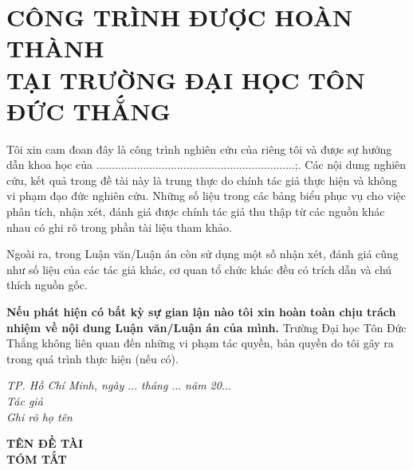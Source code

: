 \documentclass[12pt,a4paper]{report}
\numberwithin{figure}{chapter}
\numberwithin{table}{chapter}
\begin{document}
	\newpage
	\chapter*{CÔNG TRÌNH ĐƯỢC HOÀN THÀNH\\TẠI TRƯỜNG ĐẠI HỌC TÔN ĐỨC THẮNG}
	\qquad Tôi xin cam đoan đây là công trình nghiên cứu của riêng tôi và được sự hướng dẫn khoa học của ................................................................;. Các nội dung nghiên cứu, kết quả trong đề tài này là trung thực do chính tác giả thực hiện và không vi phạm đạo đức nghiên cứu. Những số liệu trong các bảng biểu phục vụ cho việc phân tích, nhận xét, đánh giá được chính tác giả thu thập từ các nguồn khác nhau có ghi rõ trong phần tài
	liệu tham khảo.
	
	\qquad Ngoài ra, trong Luận văn/Luận án còn sử dụng một số nhận xét, đánh giá cũng như số liệu của các tác giả khác, cơ quan tổ chức khác đều có trích dẫn và chú thích
	nguồn gốc.
	
	\qquad \textbf{Nếu phát hiện có bất kỳ sự gian lận nào tôi xin hoàn toàn chịu trách nhiệm về nội dung Luận văn/Luận án của mình.} Trường Đại học Tôn Đức Thắng không liên quan đến những vi phạm tác quyền, bản quyền do tôi gây ra trong quá trình thực hiện (nếu có).
	
	\vspace*{1cm}
	\begin{flushright}
		\begin{minipage}{8.75cm}
			\centering\itshape
			TP. Hồ Chí Minh, ngày $\ldots$ tháng $\ldots$ năm 20$\ldots$\\
			Tác giả\\[3cm]
			Ghi rõ họ tên
		\end{minipage}
	\end{flushright}
	
	\newpage
	\begin{center}
		\fontsize{16}{20}\selectfont\bfseries
		TÊN ĐỀ TÀI\\
		TÓM TẮT
	\end{center}
	\dotfill
	
	\dotfill
	
	\dotfill
	
	\tableofcontents
	
	
\end{document}
